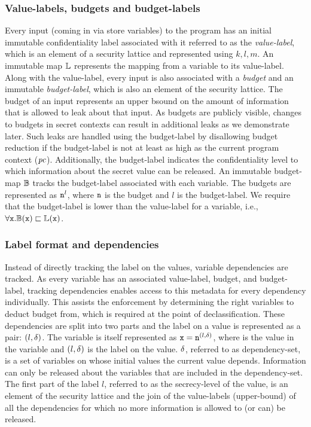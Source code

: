 \subsubsection{\textbf{Value-labels, budgets and budget-labels}}
Every input (coming in via store variables) to the program has an
initial immutable confidentiality label associated with it referred to
as the \emph{value-label}, which is an element of a security lattice
and represented using $k, l, m$. An immutable map $\mathbb{L}$
represents the mapping from a variable to its value-label. Along with
the value-label, every input is also associated with a \emph{budget}
and an immutable \emph{budget-label}, which is also an element 
of the security lattice. The budget of an input
represents an upper bsound on the amount of information that is allowed
to leak about that input. As budgets are publicly visible, changes to
budgets in secret contexts can result in additional leaks as we
demonstrate later. Such leaks are handled using the budget-label by  
disallowing budget reduction if the budget-label is not at least as
high as the current program context ($\mathit{pc}$). Additionally, the
budget-label indicates the confidentiality level to which information
about the secret value can be released. An immutable budget-map $\mathbb{B}$
tracks the budget-label associated with each variable. 
The budgets are represented as $\texttt{n}^l$, where $\texttt{n}$ is the
budget and $l$ is the budget-label. We require that the budget-label 
is lower than the value-label for a variable, i.e., 
$\forall \texttt{x}.\mathbb{B}(\texttt{x}) \sqsubset \mathbb{L}(\texttt{x})$.

\subsubsection{\textbf{Label format and dependencies}}
Instead of directly tracking the label on the values, variable
dependencies are tracked. As every variable has
an associated value-label, budget, and budget-label, tracking
dependencies enables access to this metadata for every dependency
individually. This assists the enforcement by determining the right
variables to deduct budget from, which is required at the point of
declassification. These dependencies are split into two parts and the
label on a value is represented as a pair: $(l, \delta)$. The variable
is itself represented as $\texttt{x} = \texttt{n}^{(l, \delta)}$, where 
is the value in the variable  and $(l, \delta)$ is the label on
the value. $\delta$, referred to as dependency-set, is a set of
variables on whose initial values the current value
depends. Information can only be released about the variables that are
included in the dependency-set. The first part of the label $l$,
referred to as the secrecy-level of the value, is an element of the 
security lattice and the join of the 
value-labels (upper-bound) of all the dependencies for which no more
information is allowed to (or can) be released. 

